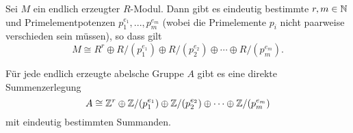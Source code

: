 \documentclass{book}
\begin{document}
\begin{cor}
    \label{cor:hirmodul}
    Sei $M$ ein endlich erzeugter $R$-Modul. Dann gibt es eindeutig
    bestimmte $r,m \in \mathbb{N}$ und Primelementpotenzen $p_1^{e_1}, ..., p_m^{e_m}$
    (wobei die Primelemente $p_i$ nicht paarweise verschieden sein müssen), so
    dass gilt 
    \[
        M \cong R^r \oplus R/(p_1^{e_1}) \oplus R/(p_2^{e_2}) \oplus \cdots \oplus R/(p_m^{e_m}).
    \]
\end{cor}

\begin{exa}
    \label{exa:klass}
    Für jede endlich erzeugte abelsche Gruppe $A$ gibt es eine direkte Summenzerlegung
    \[
        A \cong \mathbb{Z}^r \oplus \mathbb{Z}/(p_1^{e_1}) \oplus \mathbb{Z}/(p_2^{e_2}) \oplus \cdots \oplus \mathbb{Z}/(p_m^{e_m})
    \]
    mit eindeutig bestimmten Summanden.
\end{exa}
\end{document}
